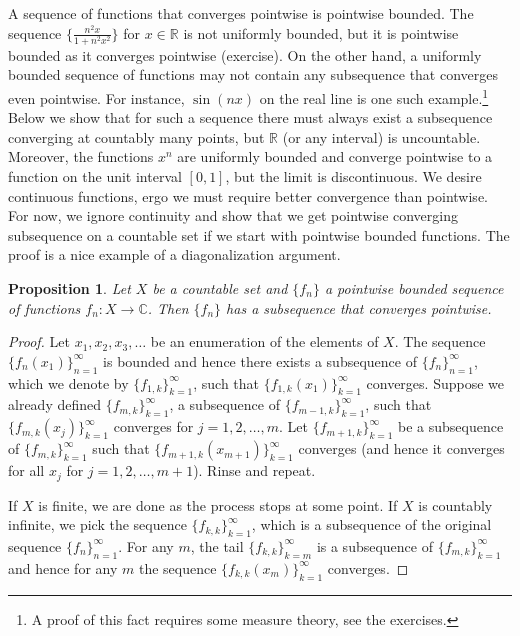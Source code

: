 \documentclass[12pt,openany]{book}
\newcommand{\C}{{\mathbb{C}}}
\newcommand{\R}{{\mathbb{R}}}
\theoremstyle{plain}
\newtheorem{prop}[thm]{Proposition}
\theoremstyle{remark}
\theoremstyle{definition}
\theoremstyle{exercise}
\theoremstyle{example}
\begin{document}
A sequence of functions that converges pointwise is pointwise bounded.
The sequence $\bigl\{ \frac{n^2x}{1+n^2x^2} \bigr\}$
for $x \in \R$
is not uniformly bounded, but it is pointwise bounded as it converges
pointwise (exercise).
On the other hand,
a uniformly bounded sequence of functions may
not contain any subsequence that converges even pointwise.
For instance, $\sin(nx)$ on the real line is one such example.\footnote{%
A proof of this fact requires some measure theory, see the exercises.}
Below we show that for such a sequence there must always exist
a subsequence converging at countably
many points, but $\R$ (or any interval) is uncountable.
Moreover,
the functions $x^n$ are uniformly bounded
and converge pointwise to a function on the unit interval $[0,1]$, but the limit
is discontinuous.  We desire continuous
functions, ergo we must require better convergence than pointwise.  For now,
we ignore continuity and show that we get pointwise
converging subsequence on a countable set
if we start with pointwise bounded functions.
The proof is a nice example of a diagonalization argument.

\begin{prop} \label{prop:subsequenceoncountableX}
Let $X$ be a countable set and $\{ f_n \}$ a pointwise bounded
sequence of functions $f_n \colon X \to \C$.
Then $\{ f_n \}$ has a subsequence that converges pointwise.
\end{prop}

\begin{proof}
Let $x_1,x_2,x_3,\ldots$ be an enumeration of the elements of $X$.
The sequence $\{ f_n(x_1) \}_{n=1}^\infty$ is bounded and hence
there exists a subsequence of $\{ f_n \}_{n=1}^{\infty}$, which we denote by
$\{ f_{1,k} \}_{k=1}^\infty$,
such that
$\{ f_{1,k}(x_1) \}_{k=1}^\infty$ converges.
Suppose we already defined $\{ f_{m,k} \}_{k=1}^\infty$,
a subsequence of $\{ f_{m-1,k} \}_{k=1}^\infty$,
such that
$\{ f_{m,k}(x_j) \}_{k=1}^\infty$ converges for $j=1,2,\ldots,m$.
Let $\{ f_{m+1,k} \}_{k=1}^\infty$ be a subsequence of
$\{ f_{m,k} \}_{k=1}^\infty$
such that
$\{ f_{m+1,k}(x_{m+1}) \}_{k=1}^\infty$ converges (and hence it converges for all
$x_j$ for $j=1,2,\ldots,m+1$).  Rinse and repeat.

If $X$ is finite, we are done as the process stops at some point.
If $X$ is countably infinite,
we pick the sequence
$\{ f_{k,k} \}_{k=1}^\infty$,
which is a subsequence of the original sequence $\{ f_n \}_{n=1}^\infty$.
For any $m$, the tail $\{ f_{k,k} \}_{k=m}^\infty$ is a subsequence of $\{ f_{m,k}
\}_{k=1}^\infty$
and hence for any $m$ the sequence $\{ f_{k,k}(x_m) \}_{k=1}^\infty$ converges.
\end{proof}
\end{document}
